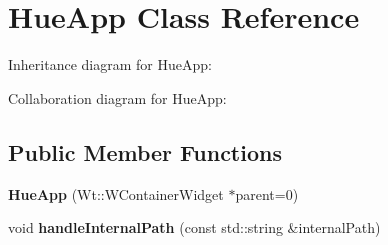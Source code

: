 \hypertarget{classHueApp}{}\section{Hue\+App Class Reference}
\label{classHueApp}


Inheritance diagram for Hue\+App\+:


Collaboration diagram for Hue\+App\+:
\subsection*{Public Member Functions}
\begin{DoxyCompactItemize}
\item 
{\bfseries Hue\+App} (Wt\+::\+W\+Container\+Widget $\ast$parent=0)\hypertarget{classHueApp_a34bbbd56837e397473a85d9d6adc99fa}{}\label{classHueApp_a34bbbd56837e397473a85d9d6adc99fa}

\item 
void {\bfseries handle\+Internal\+Path} (const std\+::string \&internal\+Path)\hypertarget{classHueApp_a434baacf5c3e79b09cbedf8057060cbb}{}\label{classHueApp_a434baacf5c3e79b09cbedf8057060cbb}

\end{DoxyCompactItemize}
